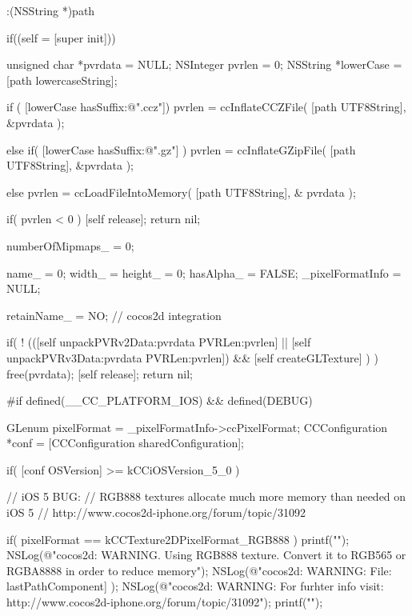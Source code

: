 \begin{DoxyCode}
                            :(NSString *)path
{
        if((self = [super init]))
        {
                unsigned char *pvrdata = NULL;
                NSInteger pvrlen = 0;
                NSString *lowerCase = [path lowercaseString];

        if ( [lowerCase hasSuffix:@".ccz"])
                        pvrlen = ccInflateCCZFile( [path UTF8String], &pvrdata 
      );

                else if( [lowerCase hasSuffix:@".gz"] )
                        pvrlen = ccInflateGZipFile( [path UTF8String], &pvrdata
       );

                else
                        pvrlen = ccLoadFileIntoMemory( [path UTF8String], &
      pvrdata );

                if( pvrlen < 0 ) {
                        [self release];
                        return nil;
                }


        numberOfMipmaps_ = 0;

                name_ = 0;
                width_ = height_ = 0;
                hasAlpha_ = FALSE;
                _pixelFormatInfo = NULL;

                retainName_ = NO; // cocos2d integration
                
                
                if( ! (([self unpackPVRv2Data:pvrdata PVRLen:pvrlen] || [self 
      unpackPVRv3Data:pvrdata PVRLen:pvrlen]) &&
                   [self createGLTexture] ) )
                {
                        free(pvrdata);
                        [self release];
                        return nil;
                }
                
#if defined(__CC_PLATFORM_IOS) && defined(DEBUG)

                GLenum pixelFormat = _pixelFormatInfo->ccPixelFormat;
                CCConfiguration *conf = [CCConfiguration sharedConfiguration];
                
                if( [conf OSVersion] >= kCCiOSVersion_5_0 )
                {
                        
                        // iOS 5 BUG:
                        // RGB888 textures allocate much more memory than
       needed on iOS 5
                        // http://www.cocos2d-iphone.org/forum/topic/31092
                        
                        if( pixelFormat == kCCTexture2DPixelFormat_RGB888 ) {
                                printf("\n");
                                NSLog(@"cocos2d: WARNING. Using RGB888 texture.
       Convert it to RGB565 or RGBA8888 in order to reduce memory");
                                NSLog(@"cocos2d: WARNING: File: %
      lastPathComponent] );
                                NSLog(@"cocos2d: WARNING: For furhter info
       visit: http://www.cocos2d-iphone.org/forum/topic/31092");
                                printf("\n");
                        }

}}}
\end{DoxyCode}
